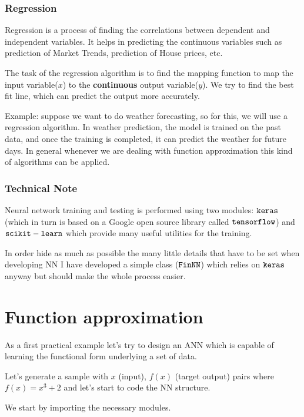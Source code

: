 \subsubsection{Regression}\label{regression}

Regression is a process of finding the correlations between dependent
and independent variables. It helps in predicting the continuous
variables such as prediction of Market Trends, prediction of House
prices, etc.

The task of the regression algorithm is to find the mapping function to
map the input variable(\(x\)) to the \textbf{continuous} output
variable(\(y\)). We try to find the best fit line, which can predict the
output more accurately.

Example: suppose we want to do weather forecasting, so for this, we will
use a regression algorithm. In weather prediction, the model is trained
on the past data, and once the training is completed, it can predict the
weather for future days. In general whenever we are dealing with
function approximation this kind of algorithms can be applied.

\subsubsection{Technical Note}\label{technical-note}

Neural network training and testing is performed using two modules:
\(\tt{keras}\) (which in turn is based on a Google open source library
called \(\tt{tensorflow}\)) and \(\tt{scikit-learn}\) which provide many
useful utilities for the training.

In order hide as much as possible the many little details that have to
be set when developing NN I have developed a simple class
(\(\tt{FinNN}\)) which relies on \(\tt{keras}\) anyway but should make
the whole process easier.

\section{Function approximation}\label{function-approximation}

As a first practical example let's try to design an ANN which is capable
of learning the functional form underlying a set of data.

Let's generate a sample with \(x\) (input), \(f(x)\) (target output)
pairs where \(f(x) = x^3 +2\) and let's start to code the NN structure.

We start by importing the necessary modules.

